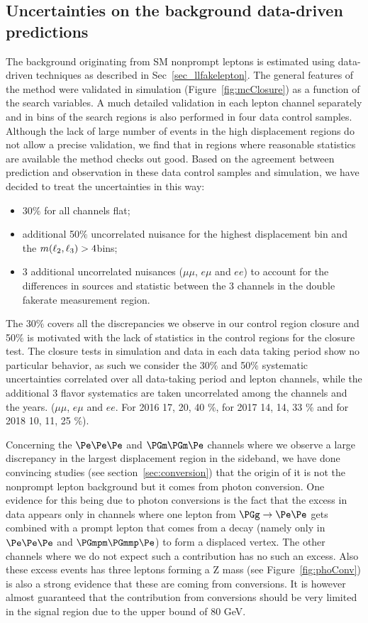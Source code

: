 \subsection{Uncertainties on the background data-driven predictions}
The background originating from SM nonprompt leptons is estimated
using data-driven techniques as described in
Sec~\ref{sec_llfakelepton}. The general features of the method were
validated in simulation (Figure~\ref{fig:mcClosure}) as a function of
the search variables. A much detailed validation in each lepton
channel separately and in bins of the search regions is also performed
in four data control samples. Although the lack of large number of events in the high displacement regions do not allow a precise validation, we find that in regions where reasonable statistics are available the method checks out good. 
Based on the agreement between prediction and observation in these data control samples and simulation, we have decided to treat the uncertainties in this way:
\begin{itemize}
\setlength\itemsep{-0.2em}
\item 30$\%$ for all channels flat;
\item additional 50$\%$ uncorrelated nuisance for the highest displacement bin and the $m(\ell_2,\ell_3) > 4$\GeV bins;
\item 3 additional uncorrelated nuisances ($\mu\mu$, $e\mu$ and $ee$) to account for the differences in sources and statistic between the 3 channels in the double fakerate measurement region.
\end{itemize}
The 30$\%$ covers all the discrepancies we observe in our control region closure and 50$\%$ is motivated with the lack of statistics in the control regions for the closure test. 
The closure tests in simulation and data in each data taking period show no particular behavior, as such we consider the 30$\%$ and 50$\%$ systematic uncertainties correlated over all data-taking period and lepton channels, while the additional 3 flavor systematics are taken uncorrelated among the channels and the years. ($\mu\mu$, $e\mu$ and $ee$. For 2016 17, 20, 40 $\%$, for 2017 14, 14, 33 $\%$ and for 2018 10, 11, 25 $\%$).

Concerning the $\Pe\Pe\Pe$ and $\PGm\PGm\Pe$ channels where we observe a large discrepancy in the largest displacement region in the sideband, we have done convincing studies (see section~\ref{sec:conversion}) that the origin of it is not the nonprompt lepton background but it comes from photon conversion. One evidence for this being due to photon conversions is the fact that the excess in data appears only in channels where one lepton from $\PGg\to\Pe\Pe$ gets combined with a prompt lepton that comes from a \PZ decay (namely only in $\Pe\Pe\Pe$ and $\PGmpm\PGmmp\Pe$) to form a displaced vertex. The other channels where we do not expect such a contribution has no such an excess. Also these excess events has three leptons forming a Z mass (see Figure~\ref{fig:phoConv}) is also a strong evidence that these are coming from conversions. It is however almost guaranteed that  the contribution from conversions should be very limited in the signal region due to the \mlll upper bound of 80 GeV. 

